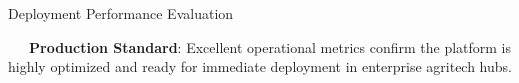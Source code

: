 \documentclass{beamer}
\begin{document}
\begin{frame}{Deployment Performance Evaluation}
\vspace{0.15cm}
\begin{tcolorbox}[enhanced, colback=primaryblue!4, colframe=primaryblue!30, boxrule=0.35pt,
  arc=3.5pt, width=0.98\textwidth, left=4pt, right=4pt, top=2.5pt, bottom=2.5pt, boxsep=0pt,
  halign=center, shadow={0.5pt}{-0.5pt}{0pt}{black!8}]
    \fontsize{5.5pt}{6.5pt}\selectfont
    \textcolor{primaryDark}{~~~\textbf{Production Standard}: Excellent operational metrics confirm the platform is highly optimized and ready for immediate deployment in enterprise agritech hubs.}
\end{tcolorbox}
\end{frame}

\end{document}
